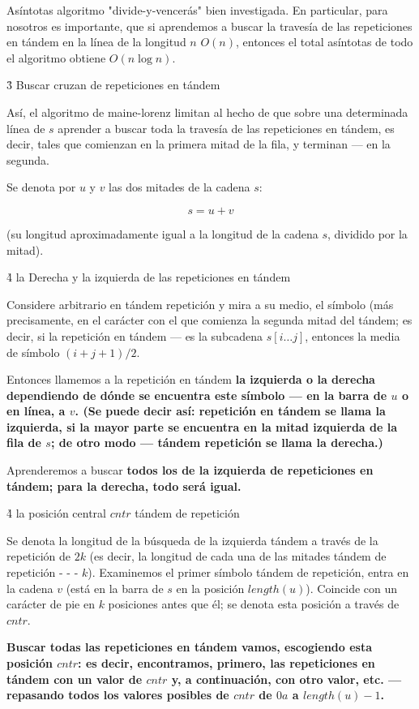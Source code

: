 Asíntotas algoritmo "divide-y-vencerás" bien investigada. En particular, para nosotros es importante, que si aprendemos a buscar la travesía de las repeticiones en tándem en la línea de la longitud $n$ $O(n)$, entonces el total asíntotas de todo el algoritmo obtiene $O (n \log n)$.


\h3{ Buscar cruzan de repeticiones en tándem }

Así, el algoritmo de maine-lorenz limitan al hecho de que sobre una determinada línea de $s$ aprender a buscar toda la travesía de las repeticiones en tándem, es decir, tales que comienzan en la primera mitad de la fila, y terminan --- en la segunda.

Se denota por $u$ y $v$ las dos mitades de la cadena $s$:

$$ s = u + v $$

(su longitud aproximadamente igual a la longitud de la cadena $s$, dividido por la mitad).


\h4{ la Derecha y la izquierda de las repeticiones en tándem }

Considere arbitrario en tándem repetición y mira a su medio, el símbolo (más precisamente, en el carácter con el que comienza la segunda mitad del tándem; es decir, si la repetición en tándem --- es la subcadena $s[i \ldots j]$, entonces la media de símbolo $(i+j+1)/2$.

Entonces llamemos a la repetición en tándem \bf{la izquierda o la derecha} dependiendo de dónde se encuentra este símbolo --- en la barra de $u$ o en línea, a $v$. (Se puede decir así: repetición en tándem se llama la izquierda, si la mayor parte se encuentra en la mitad izquierda de la fila de $s$; de otro modo --- tándem repetición se llama la derecha.)

Aprenderemos a buscar \bf{todos los de la izquierda de repeticiones en tándem}; para la derecha, todo será igual.


\h4{ la posición central $cntr$ tándem de repetición }

Se denota la longitud de la búsqueda de la izquierda tándem a través de la repetición de $2k$ (es decir, la longitud de cada una de las mitades tándem de repetición - - - $k$). Examinemos el primer símbolo tándem de repetición, entra en la cadena $v$ (está en la barra de $s$ en la posición $length(u)$). Coincide con un carácter de pie en $k$ posiciones antes que él; se denota esta posición a través de $cntr$.

\bf{Buscar todas las repeticiones en tándem vamos, escogiendo esta posición $cntr$}: es decir, encontramos, primero, las repeticiones en tándem con un valor de $cntr$ y, a continuación, con otro valor, etc. --- repasando todos los valores posibles de $cntr$ de $0 a$ a $length(u)-1$.

